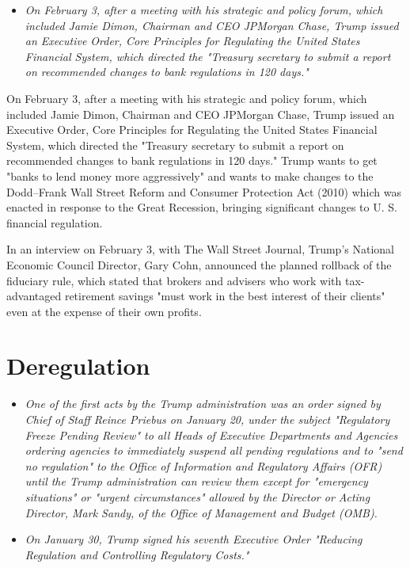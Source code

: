 \begin{itemize}
\item
  \emph{On February 3, after a meeting with his strategic and policy
  forum, which included Jamie Dimon, Chairman and CEO JPMorgan Chase,
  Trump issued an Executive Order, Core Principles for Regulating the
  United States Financial System, which directed the "Treasury secretary
  to submit a report on recommended changes to bank regulations in 120
  days."}
\end{itemize}

On February 3, after a meeting with his strategic and policy forum,
which included Jamie Dimon, Chairman and CEO JPMorgan Chase, Trump
issued an Executive Order, Core Principles for Regulating the United
States Financial System, which directed the "Treasury secretary to
submit a report on recommended changes to bank regulations in 120 days."
Trump wants to get "banks to lend money more aggressively" and wants to
make changes to the Dodd--Frank Wall Street Reform and Consumer
Protection Act (2010) which was enacted in response to the Great
Recession, bringing significant changes to U. S. financial regulation.

In an interview on February 3, with The Wall Street Journal, Trump's
National Economic Council Director, Gary Cohn, announced the planned
rollback of the fiduciary rule, which stated that brokers and advisers
who work with tax-advantaged retirement savings "must work in the best
interest of their clients" even at the expense of their own profits.

\section{Deregulation}\label{deregulation}

\begin{itemize}
\item
  \emph{One of the first acts by the Trump administration was an order
  signed by Chief of Staff Reince Priebus on January 20, under the
  subject "Regulatory Freeze Pending Review" to all Heads of Executive
  Departments and Agencies ordering agencies to immediately suspend all
  pending regulations and to "send no regulation" to the Office of
  Information and Regulatory Affairs (OFR) until the Trump
  administration can review them except for "emergency situations" or
  "urgent circumstances" allowed by the Director or Acting Director,
  Mark Sandy, of the Office of Management and Budget (OMB).}
\item
  \emph{On January 30, Trump signed his seventh Executive Order
  "Reducing Regulation and Controlling Regulatory Costs."}
\end{itemize}

